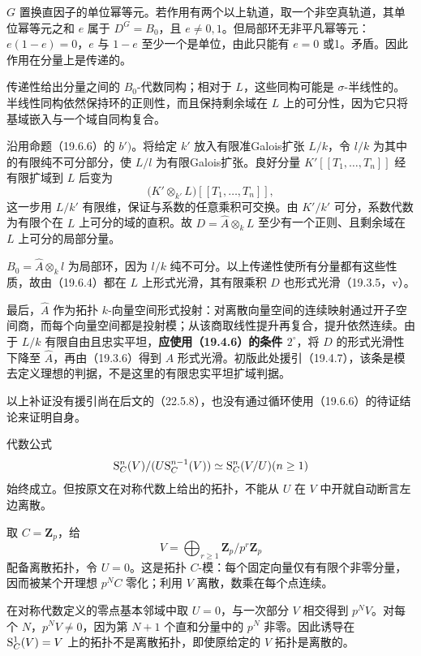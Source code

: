 $G$ 置换直因子的单位幂等元。若作用有两个以上轨道，取一个非空真轨道，其单位幂等元之和 $e$ 属于 $D^G=B_0$，且 $e\ne0,1$。但局部环无非平凡幂等元：$e(1-e)=0$，$e$ 与 $1-e$ 至少一个是单位，由此只能有 $e=0$ 或1。矛盾。因此作用在分量上是传递的。

传递性给出分量之间的 $B_0$-代数同构；相对于 $L$，这些同构可能是 $\sigma$-半线性的。半线性同构依然保持环的正则性，而且保持剩余域在 $L$ 上的可分性，因为它只将基域嵌入与一个域自同构复合。

沿用命题（19.6.6）的 $b')$。将给定 $k'$ 放入有限准Galois扩张 $L/k$，令 $l/k$ 为其中的有限纯不可分部分，使 $L/l$ 为有限Galois扩张。良好分量 $K'[[T_1,\ldots,T_n]]$ 经有限扩域到 $L$ 后变为
\[
 \bigl(K'\otimes_{k'}L\bigr)[[T_1,\ldots,T_n]],
\]
这一步用 $L/k'$ 有限维，保证与系数的任意乘积可交换。由 $K'/k'$ 可分，系数代数为有限个在 $L$ 上可分的域的直积。故 $D=\widehat A\otimes_kL$ 至少有一个正则、且剩余域在 $L$ 上可分的局部分量。

$B_0=\widehat A\otimes_kl$ 为局部环，因为 $l/k$ 纯不可分。以上传递性使所有分量都有这些性质，故由（19.6.4）都在 $L$ 上形式光滑，其有限乘积 $D$ 也形式光滑（19.3.5，v）。

最后，$\widehat A$ 作为拓扑 $k$-向量空间形式投射：对离散向量空间的连续映射通过开子空间商，而每个向量空间都是投射模；从该商取线性提升再复合，提升依然连续。由于 $L/k$ 有限自由且忠实平坦，\textbf{应使用（19.4.6）的条件 $2^\circ$}，将 $D$ 的形式光滑性下降至 $\widehat A$，再由（19.3.6）得到 $A$ 形式光滑。初版此处援引（19.4.7），该条是模去定义理想的判据，不是这里的有限忠实平坦扩域判据。

以上补证没有援引尚在后文的（22.5.8），也没有通过循环使用（19.6.6）的待证结论来证明自身。

代数公式
\[
 \mathrm S_C^n(V)/(U\mathrm S_C^{n-1}(V))\simeq\mathrm S_C^n(V/U)
 (n\geq1)
\]
始终成立。但按原文在对称代数上给出的拓扑，不能从 $U$ 在 $V$ 中开就自动断言左边离散。

取 $C=\mathbf Z_p$，给
\[
 V=\bigoplus_{r\geq1}\mathbf Z_p/p^r\mathbf Z_p
\]
配备离散拓扑，令 $U=0$。这是拓扑 $C$-模：每个固定向量仅有有限个非零分量，因而被某个开理想 $p^N C$ 零化；利用 $V$ 离散，数乘在每个点连续。

在对称代数定义的零点基本邻域中取 $U=0$，与一次部分 $V$ 相交得到 $p^N V$。对每个 $N$，$p^N V\ne0$，因为第 $N+1$ 个直和分量中的 $p^N$ 非零。因此诱导在 $\mathrm S_C^1(V)=V$ 上的拓扑不是离散拓扑，即使原给定的 $V$ 拓扑是离散的。

